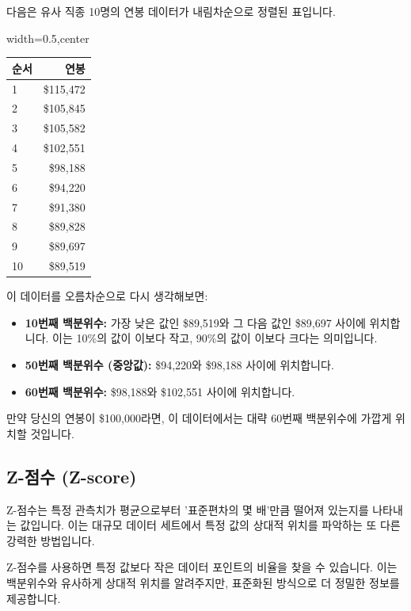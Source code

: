 \documentclass[11pt,a4paper]{article}
\theoremstyle{definition}
\begin{document}
\begin{examplebox}[title=백분위수 계산 예시: 연봉 데이터]
다음은 유사 직종 10명의 연봉 데이터가 내림차순으로 정렬된 표입니다.

\begin{adjustbox}{width=0.5\textwidth,center}
\begin{tabular}{lr}
\toprule
\textbf{순서} & \textbf{연봉} \\
\midrule
1 & \$115,472 \\
2 & \$105,845 \\
3 & \$105,582 \\
4 & \$102,551 \\
5 & \$98,188 \\
6 & \$94,220 \\
7 & \$91,380 \\
8 & \$89,828 \\
9 & \$89,697 \\
10 & \$89,519 \\
\bottomrule
\end{tabular}
\end{adjustbox}

이 데이터를 오름차순으로 다시 생각해보면:
\begin{itemize}
    \item \textbf{10번째 백분위수:} 가장 낮은 값인 \$89,519와 그 다음 값인 \$89,697 사이에 위치합니다. 이는 10\%의 값이 이보다 작고, 90\%의 값이 이보다 크다는 의미입니다.
    \item \textbf{50번째 백분위수 (중앙값):} \$94,220와 \$98,188 사이에 위치합니다.
    \item \textbf{60번째 백분위수:} \$98,188와 \$102,551 사이에 위치합니다.
\end{itemize}
만약 당신의 연봉이 \$100,000라면, 이 데이터에서는 대략 60번째 백분위수에 가깝게 위치할 것입니다.
\end{examplebox}

\newpage
\subsection{Z-점수 (Z-score)}

\begin{summarybox}[title=Z-점수 핵심 요약]
Z-점수는 특정 관측치가 평균으로부터 '표준편차의 몇 배'만큼 떨어져 있는지를 나타내는 값입니다. 이는 대규모 데이터 세트에서 특정 값의 상대적 위치를 파악하는 또 다른 강력한 방법입니다.
\end{summarybox}

Z-점수를 사용하면 특정 값보다 작은 데이터 포인트의 비율을 찾을 수 있습니다. 이는 백분위수와 유사하게 상대적 위치를 알려주지만, 표준화된 방식으로 더 정밀한 정보를 제공합니다.
\end{document}

